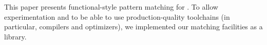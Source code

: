 This paper presents functional-style pattern matching for \Cpp{}.
To allow experimentation and to be able to use production-quality toolchains 
(in particular, compilers and optimizers), we implemented our matching 
facilities as a \Cpp{} library.



